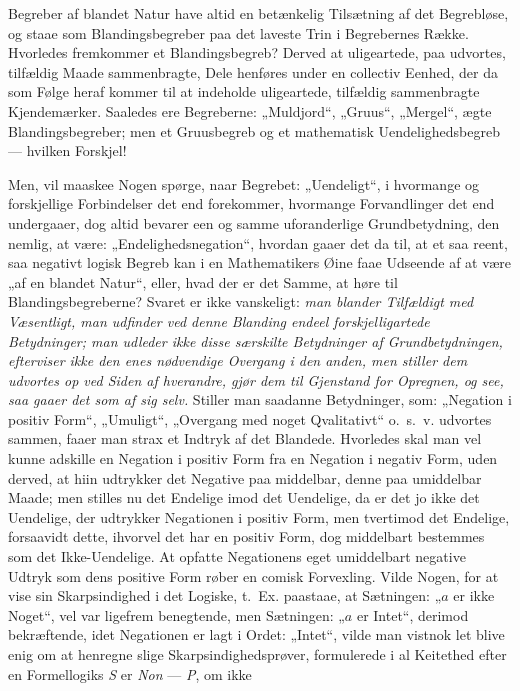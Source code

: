 \documentclass[12pt,a4paper]{book}
\begin{document}
Begreber af blandet Natur have altid en betænkelig Tilsætning af det
Begrebløse, og staae som Blandingsbegreber paa det laveste Trin i
Begrebernes Række. Hvorledes fremkommer et Blandingsbegreb? Derved
at uligeartede, paa udvortes, tilfældig Maade sammenbragte, Dele
henføres under en collectiv Eenhed, der da som Følge heraf kommer til
at indeholde uligeartede, tilfældig sammenbragte Kjendemærker.
Saaledes ere Begreberne: „Muldjord“, „Gruus“, „Mergel“, ægte
Blandingsbegreber; men et Gruusbegreb og et mathematisk
Uendelighedsbegreb --- hvilken Forskjel!

Men, vil maaskee Nogen spørge, naar Begrebet: „Uendeligt“, i hvormange
og forskjellige Forbindelser det end forekommer, hvormange
Forvandlinger det end undergaaer, dog altid bevarer een og samme
uforanderlige Grundbetydning, den nemlig, at være:
„Endelighedsnegation“, hvordan gaaer det da til, at et saa reent, saa
negativt logisk Begreb kan i en Mathematikers Øine faae Udseende af at
være „af en blandet Natur“, eller, hvad der er det Samme, at høre til
Blandingsbegreberne? Svaret er ikke vanskeligt: \emph{man blander
Tilfældigt med Væsentligt, man udfinder ved denne Blanding endeel
forskjelligartede Betydninger; man udleder ikke disse særskilte
Betydninger af Grundbetydningen, efterviser ikke den enes nødvendige
Overgang i den anden, men stiller dem udvortes op ved Siden af
hverandre, gjør dem til Gjenstand for Opregnen, og see, saa gaaer det
som af sig selv.} Stiller man saadanne Betydninger, som: „Negation i
positiv Form“, „Umuligt“, „Overgang med noget Qvalitativt“ o.~s.~v.
udvortes sammen, faaer man strax et Indtryk af det Blandede.
Hvorledes skal man vel kunne adskille en Negation i positiv Form fra
en Negation i negativ Form, uden derved, at hiin udtrykker det
Negative paa middelbar,
denne paa umiddelbar Maade; men stilles nu det Endelige imod det
Uendelige, da er det jo ikke det Uendelige, der udtrykker Negationen i
positiv Form, men tvertimod det Endelige, forsaavidt dette, ihvorvel
det har en positiv Form, dog middelbart bestemmes som det
Ikke-Uendelige. At opfatte Negationens eget umiddelbart negative
Udtryk som dens positive Form røber en comisk Forvexling. Vilde
Nogen, for at vise sin Skarpsindighed i det Logiske, t.~Ex. paastaae,
at Sætningen: „$a$ er ikke Noget“, vel var ligefrem benegtende, men
Sætningen: „$a$ er Intet“, derimod bekræftende, idet Negationen er
lagt i Ordet: „Intet“, vilde man vistnok let blive enig om at henregne
slige Skarpsindighedsprøver, formulerede i al Keitethed efter en
Formellogiks \textit{S} er \textit{Non} --- \textit{P}, om ikke
\end{document}
